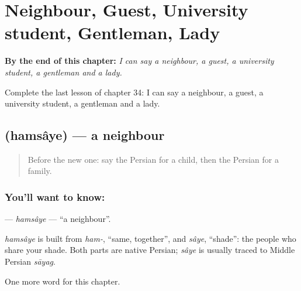 
\chapter{Neighbour, Guest, University student, Gentleman, Lady}
\label{ch:fa-neighbour-guest-university-student-gentleman-lady}

\begin{chapteropening}
\textbf{By the end of this chapter:} \emph{I can say a neighbour, a guest, a university student, a gentleman and a lady.}

Complete the last lesson of chapter 34: I can say a neighbour, a guest, a university student, a gentleman and a lady.
\end{chapteropening}

\section[\texorpdfstring{\fa{همسایه} (hamsâye)}{همسایه (hamsâye)}]{ (hamsâye) — a neighbour}

\label{lesson:FA-C34-hamsaye}



\begin{quote}
Before the new one: say the Persian for a child, then the Persian for a family.
\end{quote}

\subsection*{You'll want to know: }
\textbf{} — \emph{hamsâye} — \textquotedblleft{}a neighbour\textquotedblright{}.

\begin{cousinweb}
\emph{hamsâye} is built from \emph{ham-}, \textquotedblleft{}same, together\textquotedblright{}, and \emph{sâye}, \textquotedblleft{}shade\textquotedblright{}: the people who share your shade. Both parts are native Persian; \emph{sâye} is usually traced to Middle Persian \emph{sāyag}.
\end{cousinweb}

\begin{grammarlens}[title={What you've built}]
One more word for this chapter.
\end{grammarlens}

